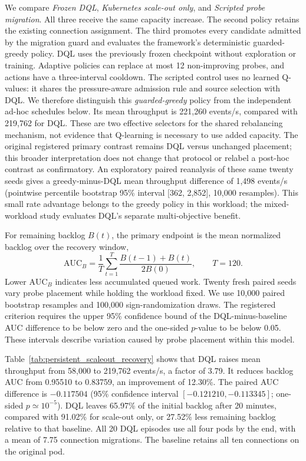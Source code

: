 We compare \emph{Frozen DQL}, \emph{Kubernetes scale-out only}, and
\emph{Scripted probe migration}. All three receive the same capacity increase.
The second policy retains the existing connection assignment. The third
promotes every candidate admitted by the migration guard and evaluates the
framework's deterministic guarded-greedy policy. DQL uses the previously frozen checkpoint
without exploration or training. Adaptive policies can replace at most 12
non-improving probes, and actions have a three-interval cooldown.
The scripted control uses no learned Q-values: it shares the pressure-aware
admission rule and source selection with DQL. We therefore distinguish this
\emph{guarded-greedy} policy from the independent ad-hoc schedules below.
Its mean throughput is 221,260 events/s, compared with 219,762 for DQL. These
are two effective selectors for the shared rebalancing mechanism, not evidence
that Q-learning is necessary to use added capacity. The original registered
primary contrast remains DQL versus unchanged placement; this broader
interpretation does not change that protocol or relabel a post-hoc contrast
as confirmatory. An exploratory paired reanalysis of these same twenty seeds
gives a greedy-minus-DQL mean throughput difference of 1,498 events/s
(pointwise percentile bootstrap 95\% interval [362, 2,852], 10,000 resamples).
This small rate advantage belongs to the greedy policy in this workload;
the mixed-workload study evaluates DQL's separate multi-objective benefit.

For remaining backlog $B(t)$, the primary endpoint is the mean normalized
backlog over the recovery window,
\begin{equation}
 \mathrm{AUC}_B=\frac{1}{T}\sum_{t=1}^{T}
 \frac{B(t-1)+B(t)}{2B(0)},\qquad T=120.
 \label{eq:scaleout-backlog-auc}
\end{equation}
Lower $\mathrm{AUC}_B$ indicates less accumulated queued work. Twenty fresh paired seeds
vary probe placement while holding the workload fixed. We use 10,000 paired
bootstrap resamples and 100,000 sign-randomization draws. The registered
criterion requires the upper 95\% confidence bound of the DQL-minus-baseline
AUC difference to be below zero and the one-sided $p$-value to be below 0.05.
These intervals describe variation caused by probe placement within this model.



Table~\ref{tab:persistent_scaleout_recovery} shows that DQL raises mean
throughput from 58,000 to 219,762 events/s, a factor of 3.79. It reduces backlog
AUC from 0.95510 to 0.83759, an improvement of 12.30\%. The paired AUC
difference is $-0.117504$ (95\% confidence interval
$[-0.121210,-0.113345]$; one-sided $p\simeq10^{-5}$). DQL leaves 65.97\% of
the initial backlog after 20 minutes, compared with 91.02\% for scale-out only,
or 27.52\% less remaining backlog relative to that baseline. All 20 DQL
episodes use all four pods by the end, with a mean of 7.75 connection
migrations. The baseline retains all ten connections on the original pod.

